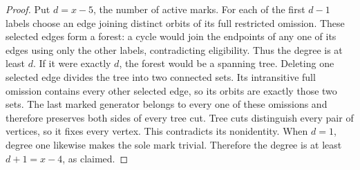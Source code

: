 \documentclass[11pt,a4paper]{article}
\begin{document}
\begin{proof}
Put $d=x-5$, the number of active marks. For each
of the first $d-1$ labels choose an edge joining
distinct orbits of its full restricted omission.
These selected edges form a forest: a cycle would
join the endpoints of any one of its edges using
only the other labels, contradicting eligibility.
Thus the degree is at least $d$. If it were exactly
$d$, the forest would be a spanning tree. Deleting
one selected edge divides the tree into two connected
sets. Its intransitive full omission contains every
other selected edge, so its orbits are exactly those
two sets. The last marked generator belongs to every
one of these omissions and therefore preserves both
sides of every tree cut. Tree cuts distinguish every
pair of vertices, so it fixes every vertex. This
contradicts its nonidentity. When $d=1$, degree one
likewise makes the sole mark trivial. Therefore the
degree is at least $d+1=x-4$, as claimed.
\end{proof}
\end{document}
